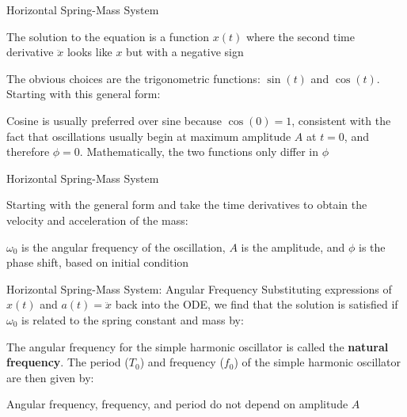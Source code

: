 \documentclass[12pt,compress,aspectratio=169]{beamer}
\begin{document}
\begin{frame}{Horizontal Spring-Mass System}

  The solution to the equation is a function $x(t)$ where the second time
  derivative $\ddot x$ looks like $x$ but with a negative sign


  The obvious choices are the trigonometric functions: $\sin(t)$ and $\cos(t)$.
  Starting with this general form:
    
  
  Cosine is usually preferred over sine because $\cos(0)=1$, consistent with
  the fact that oscillations usually begin at maximum amplitude $A$ at $t=0$,
  and therefore $\phi=0$. Mathematically, the two functions only differ in
  $\phi$
\end{frame}



\begin{frame}{Horizontal Spring-Mass System}

  
  Starting with the general form and take the time derivatives to obtain the
  velocity and acceleration of the mass:
 
  \vspace{-.2in}{\large
    \begin{align*}
      x(t)&=A\cos(\omega_0 t-\phi)\\
      v(t)&=-A\omega_0\sin(\omega_0 t-\phi)\\
      a(t)&=-A\omega_0^2\cos(\omega_0 t-\phi)=-\omega_0^2x
    \end{align*}
  }
  
  $\omega_0$ is the angular frequency of the oscillation, $A$ is the amplitude,
  and $\phi$ is the phase shift, based on initial condition
\end{frame}



\begin{frame}{Horizontal Spring-Mass System: Angular Frequency}
  Substituting expressions of $x(t)$ and $a(t)=\ddot x$ back into the ODE, we
  find that the solution is satisfied if $\omega_0$ is related to the spring
  constant and mass by:


  The angular frequency for the simple harmonic oscillator is called the
  \textbf{natural frequency}. The period ($T_0$) and frequency ($f_0$) of the
  simple harmonic oscillator are then given by:

  
  Angular frequency, frequency, and period do not depend on amplitude $A$
\end{frame}
\end{document}
